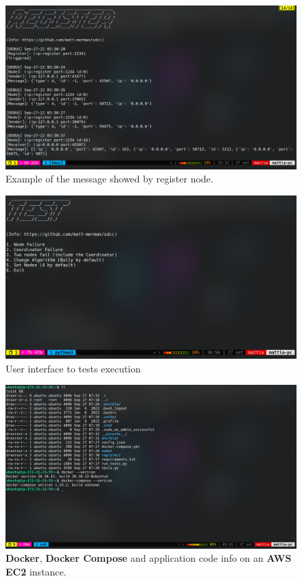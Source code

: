 \documentclass[conference]{IEEEtran}
\begin{document}
\begin{figure}[htb]\label{fig:verbose}
\includegraphics[width=\linewidth]{figure/verbose.png}
\caption{Example of the message showed by register node.}
\end{figure}

\begin{figure}[htb]\label{fig:tests}
\includegraphics[width=\linewidth]{figure/tests.png}
\caption{User interface to tests execution}
\end{figure}

\begin{figure}[htb]\label{fig:aws}
\includegraphics[width=\linewidth]{figure/aws_demo.png}
\caption{\textbf{Docker}, \textbf{Docker Compose} and application code info on an \textbf{AWS EC2} instance.}
\end{figure}

\printbibliography
\end{document}
